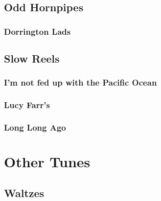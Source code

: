 \documentclass[letterpaper,10pt,english]{sphinxmanual}
\begin{document}
\section{Odd Hornpipes}
\label{\detokenize{Pipe Tunes/Dorrington Lads:odd-hornpipes}}\label{\detokenize{Pipe Tunes/Dorrington Lads::doc}}

\subsection{Dorrington Lads}
\label{\detokenize{Pipe Tunes/Dorrington Lads:dorrington-lads}}
\noindent{}


\section{Slow Reels}
\label{\detokenize{Pipe Tunes/I'm not fed up with the Pacific Ocean:slow-reels}}\label{\detokenize{Pipe Tunes/I'm not fed up with the Pacific Ocean::doc}}

\subsection{I’m not fed up with the Pacific Ocean}
\label{\detokenize{Pipe Tunes/I'm not fed up with the Pacific Ocean:i-m-not-fed-up-with-the-pacific-ocean}}
\noindent{}


\subsection{Lucy Farr’s}
\label{\detokenize{Pipe Tunes/I'm not fed up with the Pacific Ocean:lucy-farr-s}}
\noindent{}


\subsection{Long Long Ago}
\label{\detokenize{Pipe Tunes/I'm not fed up with the Pacific Ocean:long-long-ago}}
\noindent{}


\chapter{Other Tunes}
\label{\detokenize{Other Tunes/index:other-tunes}}\label{\detokenize{Other Tunes/index::doc}}

\section{Waltzes}
\label{\detokenize{Other Tunes/Waltzes:waltzes}}\label{\detokenize{Other Tunes/Waltzes::doc}}
\end{document}
